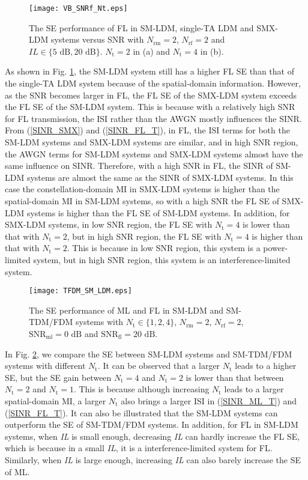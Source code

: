 \documentclass[journal]{IEEEtran}
\begin{document}
\begin{figure}
  \centering
  \texttt{[image: VB\_SNRf\_Nt.eps]}
  \caption{The SE performance of FL in SM-LDM, single-TA LDM and SMX-LDM systems versus SNR with $N_\text{rm} = 2$, $N_\text{rf} = 2$ and $\textit{IL} \in \{5 \text{ dB}, 20 \text{ dB}\}$. $N_\text{t} = 2$ in (a) and $N_\text{t} = 4$ in (b).}\label{VB_SNRf_Nt}
\end{figure}

As shown in Fig. \ref{VB_SNRf_Nt}, the SM-LDM system still has a higher FL SE than that of the single-TA LDM system because of the spatial-domain information. However, as the SNR becomes larger in FL, the FL SE of the SMX-LDM system exceeds the FL SE of the SM-LDM system. This is because with a relatively high SNR for FL transmission, the ISI rather than the AWGN mostly influences the SINR. From (\ref{SINR_SMX}) and (\ref{SINR_FL_T}), in FL, the ISI terms for both the SM-LDM systems and SMX-LDM systems are similar, and in high SNR region, the AWGN terms for SM-LDM systems and SMX-LDM systems almost have the same influence on SINR. Therefore, with a high SNR in FL, the SINR of SM-LDM systems are almost the same as the SINR of SMX-LDM systems. In this case the constellation-domain MI in SMX-LDM systems is higher than the spatial-domain MI in SM-LDM systems, so with a high SNR the FL SE of SMX-LDM systems is higher than the FL SE of SM-LDM systems. In addition, for SMX-LDM systems, in low SNR region, the FL SE with $N_\text{t} = 4$ is lower than that with $N_\text{t} = 2$, but in high SNR region, the FL SE with $N_\text{t} = 4$ is higher than that with $N_\text{t} = 2$. This is because in low SNR region, this system is a power-limited system, but in high SNR region, this system is an interference-limited system.

\begin{figure}
  \centering
  \texttt{[image: TFDM\_SM\_LDM.eps]}
  \caption{The SE performance of ML and FL in SM-LDM and SM-TDM/FDM systems with $N_\text{t} \in \{1,2,4\}$, $N_\text{rm} = 2$, $N_\text{rf} = 2$, $\text{SNR}_\text{ml} = 0 \text{ dB}$ and $\text{SNR}_\text{fl} = 20 \text{ dB}$.}\label{TFDM_SM_LDM}
\end{figure}

In Fig. \ref{TFDM_SM_LDM}, we compare the SE between SM-LDM systems and SM-TDM/FDM systems with different $N_\text{t}$. It can be observed that a larger $N_\text{t}$ leads to a higher SE, but the SE gain between $N_\text{t} = 4$ and $N_\text{t} = 2$ is lower than that between $N_\text{t} = 2$ and $N_\text{t} = 1$. This is because although increasing $N_\text{t}$ leads to a larger spatial-domain MI, a larger $N_\text{t}$ also brings a larger ISI in (\ref{SINR_ML_T}) and (\ref{SINR_FL_T}). It can also be illustrated that the SM-LDM systems can outperform the SE of SM-TDM/FDM systems. In addition, for FL in SM-LDM systems, when \textit{IL} is small enough, decreasing \textit{IL} can hardly increase the FL SE, which is because in a small \textit{IL}, it is a interference-limited system for FL. Similarly, when \textit{IL} is large enough, increasing \textit{IL} can also barely increase the SE of ML.
\end{document}
